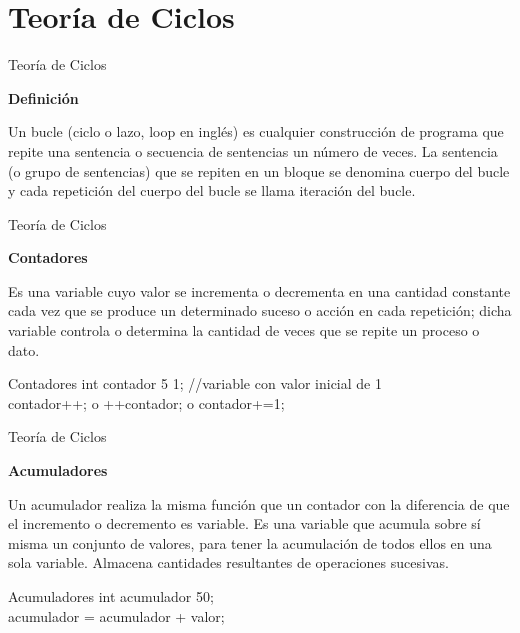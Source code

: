 \setlength{\parskip}{\baselineskip}
\section*{Teoría de Ciclos}

\begin{frame}{Teoría de Ciclos}
    \begin{center}\textbf{Definición}\end{center}
    \justify
    \hspace{5mm}
    Un bucle (ciclo o lazo, loop en inglés) es cualquier construcción de programa que
    repite una sentencia o secuencia de sentencias un número de veces. La sentencia (o
    grupo de sentencias) que se repiten en un bloque se denomina cuerpo del bucle y
    cada repetición del cuerpo del bucle se llama iteración del bucle.
\end{frame}


\begin{frame}{Teoría de Ciclos}
    \begin{center}\textbf{Contadores}\end{center}
    \vspace{-2mm}
    Es una variable cuyo valor se incrementa o decrementa en una cantidad constante cada vez que se produce un determinado suceso o acción en cada repetición; dicha variable controla o determina la cantidad de veces que se repite un proceso o dato.
    \begin{block}{Contadores}
        int contador 5 1; //variable con valor inicial de 1\\
        contador++; o ++contador; o contador+=1;
    \end{block}
\end{frame}


\begin{frame}{Teoría de Ciclos}
    \vspace{-1mm}
    \begin{center}\textbf{Acumuladores}\end{center}
    \vspace{-3mm}
    Un acumulador realiza la misma función que un contador con la diferencia de que el incremento o decremento es variable. Es una variable que acumula sobre sí misma un conjunto de valores, para tener la acumulación de todos ellos en una sola variable. Almacena cantidades resultantes de operaciones sucesivas.
    \begin{block}{Acumuladores}
        int acumulador 50;\\
        acumulador = acumulador + valor;
    \end{block}
\end{frame}


